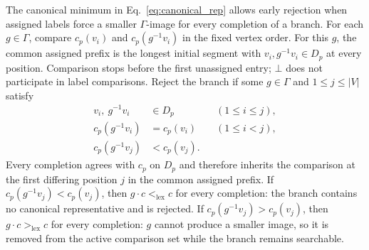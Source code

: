 \documentclass[a5paper, 10pt]{article}
\begin{document}
The canonical minimum in Eq.~\ref{eq:canonical_rep} allows early rejection when assigned labels force a smaller $\Gamma$-image for every completion of a branch.
For each $g\in\Gamma$, compare $c_p(v_i)$ and $c_p(g^{-1}v_i)$ in the fixed vertex order. For this $g$, the common assigned prefix is the longest initial segment with $v_i,g^{-1}v_i\in D_p$ at every position. Comparison stops before the first unassigned entry; $\bot$ does not participate in label comparisons. Reject the branch if some $g\in\Gamma$ and $1\leq j\leq |V|$ satisfy%
\begin{equation}
\begin{aligned}
v_i,\ g^{-1}v_i&\in D_p &&(1\leq i\leq j),\\
c_p(g^{-1}v_i)&=c_p(v_i) &&(1\leq i<j),\\
c_p(g^{-1}v_j)&<c_p(v_j).
\end{aligned}
\label{eq:prefix_rejection}
\end{equation}
Every completion agrees with $c_p$ on $D_p$ and therefore inherits the comparison at the first differing position $j$ in the common assigned prefix. If $c_p(g^{-1}v_j)<c_p(v_j)$, then $g\cdot c<_{\mathrm{lex}}c$ for every completion: the branch contains no canonical representative and is rejected. If $c_p(g^{-1}v_j)>c_p(v_j)$, then $g\cdot c>_{\mathrm{lex}}c$ for every completion: $g$ cannot produce a smaller image, so it is removed from the active comparison set while the branch remains searchable.
\end{document}
